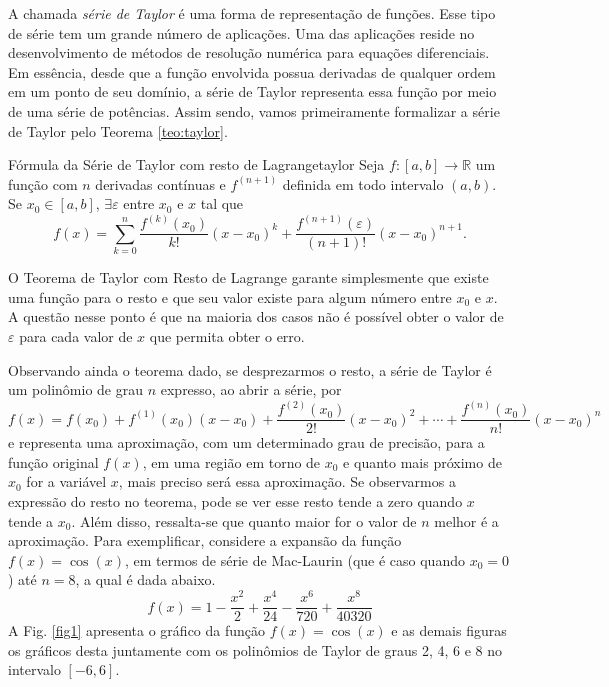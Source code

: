 \documentclass[10pt]{article}
\begin{document}
A chamada \emph{série de Taylor} é uma forma de representação de funções. 
Esse tipo de série tem um grande número de aplicações. Uma das aplicações  
reside no desenvolvimento de métodos de resolução numérica para equações 
diferenciais. Em essência, desde que a função envolvida possua derivadas 
de qualquer ordem em um ponto de seu domínio, a série de Taylor representa 
essa função por meio de uma série de potências. Assim sendo, vamos 
primeiramente formalizar a série de Taylor pelo Teorema \ref{teo:taylor}.

\begin{teorema}{Fórmula da Série de Taylor com resto de Lagrange}{taylor}
Seja $f:[a,b]\rightarrow \mathbb{R}$ um função com $n$ derivadas contínuas 
e $f^{(n+1)}$ definida em todo intervalo $(a,b)$. Se $x_0\in[a,b]$, 
$\exists \varepsilon$ entre $x_0$ e $x$ tal que
\begin{equation}
f(x)=\sum\limits_{k=0}^{n}\dfrac{f^{(k)}(x_0)}{k!}(x-x_0)^k+
\dfrac{f^{(n+1)}(\varepsilon)}{(n+1)!}(x-x_0)^{n+1}.
\label{eq1}
\end{equation}
\end{teorema}

O Teorema de Taylor com Resto de Lagrange garante simplesmente que
existe uma função para o resto e que seu valor existe para algum 
número entre $x_0$ e $x$. A questão nesse ponto é que na maioria dos 
casos não é possível obter o valor de $\varepsilon$ para cada valor 
de $x$ que permita obter o erro. 

Observando ainda o teorema dado, se desprezarmos o resto, a série 
de Taylor é um polinômio de grau $n$ expresso, ao abrir a série, por
\[
f(x)=f(x_0)+f^{(1)}(x_0)(x-x_0)+\dfrac{f^{(2)}(x_0)}{2!}
(x-x_0)^2+\cdots+\dfrac{f^{(n)}(x_0)}{n!}
(x-x_0)^n
\]
e representa uma aproximação, com um determinado grau de precisão, 
para a função original $f(x)$, em uma região em torno de $x_0$ e 
quanto mais próximo de $x_0$ for a variável $x$, mais preciso será 
essa aproximação. Se observarmos a expressão do resto no teorema, 
pode se ver esse resto tende a zero quando $x$ tende a $x_0$. 
Além disso, ressalta-se que quanto maior for o valor de $n$ melhor é 
a aproximação. Para exemplificar, considere a expansão da função 
$f(x)=\cos(x)$, em termos de série de Mac-Laurin 
(que é caso quando $x_0=0$) até $n=8$, a qual é dada abaixo.
\begin{equation}
f(x)=1-\frac{{{x}^{2}}}{2}+\frac{{{x}^{4}}}{24}-
\frac{{{x}^{6}}}{720}+\frac{{{x}^{8}}}{40320}
\end{equation}
A Fig. \ref{fig1} apresenta o gráfico da função $f(x)=\cos(x)$ e as demais 
figuras os gráficos desta juntamente com os polinômios de Taylor de 
graus 2, 4, 6 e 8 no intervalo $[-6,6]$.
\end{document}

